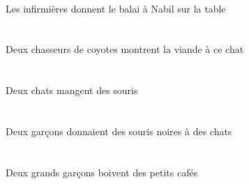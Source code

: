 \begin{exe}
    \DEFSgOblG{}   \tableDSgOblG{}   \SURG{}   \DEFPlErgG{}   \infirmiereAPlErgG{}    \INDSgDatG{}   \NabilDSgDatG{}   \DEFSgAbsG{}   \balaiASgAbsG{}  \donnerVdPrsASgG{} \\
 Les infirmières donnent le balai à Nabil sur la table
\ex\glll
   \INDDuErg{}    \INDPlObl{}   \coyoteCPlObl{}   \DE{}   \chasseurCDuErg{}    \DEMSgDat{}   \chatDSgDat{}   \DEFSgAbs{}   \viandeASgAbs{}  \montrerVdPrsASg{} \\
   \INDDuErgP{}    \INDPlOblP{}   \coyoteCPlOblP{}   \DEP{}   \chasseurCDuErgP{}    \DEMSgDatP{}   \chatDSgDatP{}   \DEFSgAbsP{}   \viandeASgAbsP{}  \montrerVdPrsASgP{} \\
   \INDDuErgG{}    \INDPlOblG{}   \coyoteCPlOblG{}   \DEG{}   \chasseurCDuErgG{}    \DEMSgDatG{}   \chatDSgDatG{}   \DEFSgAbsG{}   \viandeASgAbsG{}  \montrerVdPrsASgG{} \\
 Deux chasseurs de coyotes montrent la viande à ce chat
\ex\glll
   \INDDuErg{}   \chatDDuErg{}   \INDPlAbs{}   \sourisBPlAbs{}  \mangerVtPrsBPl{} \\
   \INDDuErgP{}   \chatDDuErgP{}   \INDPlAbsP{}   \sourisBPlAbsP{}  \mangerVtPrsBPlP{} \\
   \INDDuErgG{}   \chatDDuErgG{}   \INDPlAbsG{}   \sourisBPlAbsG{}  \mangerVtPrsBPlG{} \\
 Deux chats mangent des souris
\ex\glll
   \INDDuErg{}   \garconDDuErg{}    \INDPlDat{}   \chatDPlDat{}   \INDPlAbs{}   \noirBPl{}   \sourisBPlAbs{}  \donnerVdPstBPl{} \\
   \INDDuErgP{}   \garconDDuErgP{}    \INDPlDatP{}   \chatDPlDatP{}   \INDPlAbsP{}   \noirBPlP{}   \sourisBPlAbsP{}  \donnerVdPstBPlP{} \\
   \INDDuErgG{}   \garconDDuErgG{}    \INDPlDatG{}   \chatDPlDatG{}   \INDPlAbsG{}   \noirBPlG{}   \sourisBPlAbsG{}  \donnerVdPstBPlG{} \\
 Deux garçons donnaient des souris noires à des chats
\ex\glll
   \INDDuErg{}   \grandDDu{}   \garconDDuErg{}   \INDPlAbs{}   \petitCPl{}   \cafeCPlAbs{}  \boireVtPrsCPl{} \\
   \INDDuErgP{}   \grandDDuP{}   \garconDDuErgP{}   \INDPlAbsP{}   \petitCPlP{}   \cafeCPlAbsP{}  \boireVtPrsCPlP{} \\
   \INDDuErgG{}   \grandDDuG{}   \garconDDuErgG{}   \INDPlAbsG{}   \petitCPlG{}   \cafeCPlAbsG{}  \boireVtPrsCPlG{} \\
 Deux grands garçons boivent des petits cafés
\ex\glll
   \DEFSgErg{}   \noirBSg{}   \theBSgErg{}   \DEFPlAbs{}   \coyoteCPlAbs{}  \chasserVtPrsCPl{} \\

\end{exe}
